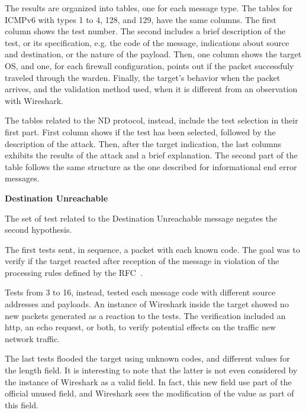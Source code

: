 \documentclass[12pt]{article}
\begin{document}
The results are organized into tables, one for each message type. The tables for ICMPv6 with types 1 to 4, 128, and 129, have the same columns. The first column shows the test number. The second includes a brief description of the test, or its specification, e.g. the code of the message, indications about source and destination, or the nature of the payload. Then, one column shows the target OS, and one, for each firewall configuration, points out if the packet successfuly traveled through the warden. Finally, the target's behavior when the packet arrives, and the validation method used, when it is different from an observation with Wireshark.

The tables related to the ND protocol, instead, include the test selection in their first part. First column shows if the test has been selected, followed by the description of the attack. Then, after the target indication, the last columns exhibits the results of the attack and a brief explanation. The second part of the table follows the same structure as the one described for informational end error messages.


\textbf{Destination Unreachable}

The set of test related to the Destination Unreachable message negates the second hypothesis.

The first tests sent, in sequence, a packet with each known code. The goal was to verify if the target reacted after reception of the message in violation of the processing rules defined by the RFC~\cite{rfc4443}.

Tests from 3 to 16, instead, tested each message code with different source addresses and payloads. An instance of Wireshark inside the target showed no new packets generated as a reaction to the tests. The verification included an http, an echo request, or both, to verify potential effects on the traffic new network traffic.

The last tests flooded the target using unknown codes, and different values for the length field. It is interesting to note that the latter is not even considered by the instance of Wireshark as a valid field. In fact, this new field use part of the official unused field, and Wireshark sees the modification of the value as part of this field.
\end{document}
